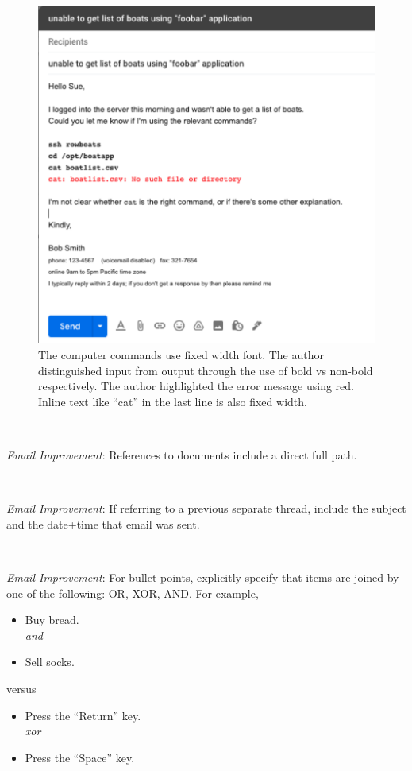 \begin{figure}%
\includegraphics[width=1\textwidth]{images/email_computer_font.pdf}
\caption{The computer commands use fixed width font. The author distinguished input from output through the use of bold vs non-bold respectively. The author highlighted the error message using red. Inline text like ``cat'' in the last line is also fixed width.}
\label{fig:email_computer_font}
\end{figure}

\ \\
\begin{samepage}
\textit{Email Improvement}: References to documents include a direct full path.
\end{samepage}

\ \\
\begin{samepage}
\textit{Email Improvement}: If referring to a previous separate thread, include the subject and the date+time that email was sent.
\end{samepage}

\ \\
\begin{samepage}
\textit{Email Improvement}: For bullet points, explicitly specify that items are joined by one of the following: OR, XOR, AND. For example,
\begin{itemize}
    \item Buy bread.\\
    \textit{and}
    \item Sell socks.
\end{itemize}
versus
\begin{itemize}
    \item Press the ``Return'' key.\\
    \textit{xor}
    \item Press the ``Space'' key.
\end{itemize}
\end{samepage}

